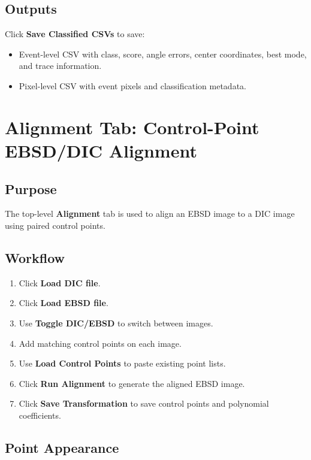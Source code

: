 \documentclass[11pt]{article}
\newcommand{\ui}[1]{\textbf{#1}}
\begin{document}
\subsection{Outputs}

Click \ui{Save Classified CSVs} to save:

\begin{itemize}
    \item Event-level CSV with class, score, angle errors, center coordinates, best mode, and trace information.
    \item Pixel-level CSV with event pixels and classification metadata.
\end{itemize}

\section{Alignment Tab: Control-Point EBSD/DIC Alignment}

\subsection{Purpose}

The top-level \ui{Alignment} tab is used to align an EBSD image to a DIC image using paired control points.

\subsection{Workflow}

\begin{enumerate}
    \item Click \ui{Load DIC file}.
    \item Click \ui{Load EBSD file}.
    \item Use \ui{Toggle DIC/EBSD} to switch between images.
    \item Add matching control points on each image.
    \item Use \ui{Load Control Points} to paste existing point lists.
    \item Click \ui{Run Alignment} to generate the aligned EBSD image.
    \item Click \ui{Save Transformation} to save control points and polynomial coefficients.
\end{enumerate}


\subsection{Point Appearance}
\end{document}

